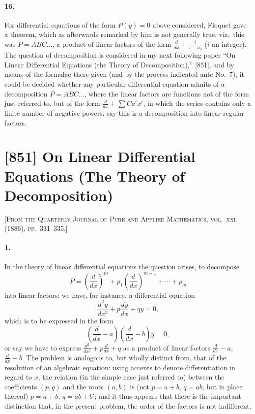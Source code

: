 \documentclass[11pt,a4paper]{article}
\theoremstyle{definition}
\begin{document}
\paragraph{16.} For differential equations of the form $P(y) = 0$ above considered, Floquet gave a theorem, which as afterwards remarked by him is not generally true, viz.\ this was $P = ABC\ldots$, a product of linear factors of the form $\frac{d}{dx} + \frac{i}{x-a_{0}}$ ($i$ an integer). The question of decomposition is considered in my next following paper ``On Linear Differential Equations (the Theory of Decomposition),'' [851], and by means of the formulae there given (and by the process indicated ante No.~7), it could be decided whether any particular differential equation admits of a decomposition $P = ABC\ldots$, where the linear factors are functions not of the form just referred to, but of the form $\frac{d}{dx} + \sum Ca^{i}x^{i}$, in which the series contains only a finite number of negative powers, say this is a decomposition into linear regular factors.

\newpage
\section*{[851] On Linear Differential Equations (The Theory of Decomposition)}

\noindent\textsc{[From the Quarterly Journal of Pure and Applied Mathematics, vol.~xxi. (1886), pp.~331--335.]}

\smallskip

\paragraph{1.} In the theory of linear differential equations the question arises, to decompose
\[
P = \left(\frac{d}{dx}\right)^{m} + p_{1}\left(\frac{d}{dx}\right)^{m-1} + \cdots + p_{m}
\]
into linear factors: we have, for instance, a differential equation
\[
\frac{d^{2}y}{dx^{2}} + p\frac{dy}{dx} + qy = 0,
\]
which is to be expressed in the form
\[
\left(\frac{d}{dx} - a\right)\left(\frac{d}{dx} - b\right)y = 0,
\]
or say we have to express $\frac{d^{2}}{dx^{2}} + p\frac{d}{dx} + q$ as a product of linear factors $\frac{d}{dx} - a$, $\frac{d}{dx} - b$. The problem is analogous to, but wholly distinct from, that of the resolution of an algebraic equation: using accents to denote differentiation in regard to $x$, the relation (in the simple case just referred to) between the coefficients $(p,q)$ and the roots $(a,b)$ is (not $p = a+b$, $q = ab$, but in place thereof) $p = a+b$, $q = ab + b'$; and it thus appears that there is the important distinction that, in the present problem, the order of the factors is not indifferent.
\end{document}
